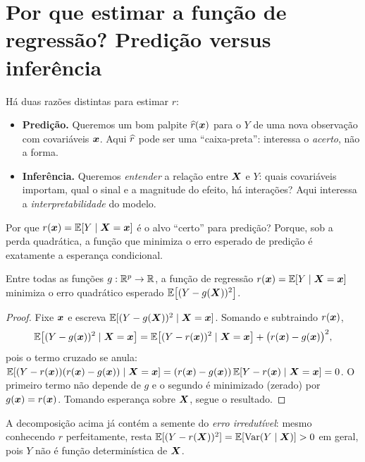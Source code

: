 \documentclass[11pt,a4paper]{article}
\begin{document}
\section{Por que estimar a função de regressão? Predição versus inferência}
Há duas razões distintas para estimar $r$:
\begin{itemize}[leftmargin=1.4cm]
  \item \textbf{Predição.} Queremos um bom palpite $\widehat{r}(\bm{x})$ para o $Y$ de uma
        nova observação com covariáveis $\bm{x}$. Aqui $\widehat{r}$ pode ser uma
        ``caixa-preta'': interessa o \emph{acerto}, não a forma.
  \item \textbf{Inferência.} Queremos \emph{entender} a relação entre $\bm{X}$ e $Y$:
        quais covariáveis importam, qual o sinal e a magnitude do efeito, há
        interações? Aqui interessa a \emph{interpretabilidade} do modelo.
\end{itemize}

\begin{ideia}
Por que $r(\bm{x})=\mathbb{E}[Y\mid\bm{X}=\bm{x}]$ é o alvo ``certo'' para predição? Porque, sob a
perda quadrática, a função que minimiza o erro esperado de predição é exatamente a
esperança condicional.
\end{ideia}

\begin{proposicao}\label{prop:r}
Entre todas as funções $g:\mathbb{R}^p\to\mathbb{R}$, a função de regressão
$r(\bm{x})=\mathbb{E}[Y\mid\bm{X}=\bm{x}]$ minimiza o erro quadrático esperado
$\mathbb{E}\big[(Y-g(\bm{X}))^2\big]$.
\end{proposicao}
\begin{proof}
Fixe $\bm{x}$ e escreva $\mathbb{E}[(Y-g(\bm{X}))^2\mid\bm{X}=\bm{x}]$. Somando e subtraindo $r(\bm{x})$,
\[
  \mathbb{E}\big[(Y-g(\bm{x}))^2\mid\bm{X}=\bm{x}\big]
  = \mathbb{E}\big[(Y-r(\bm{x}))^2\mid\bm{X}=\bm{x}\big] + \big(r(\bm{x})-g(\bm{x})\big)^2,
\]
pois o termo cruzado se anula:
$\mathbb{E}[(Y-r(\bm{x}))(r(\bm{x})-g(\bm{x}))\mid\bm{X}=\bm{x}]=(r(\bm{x})-g(\bm{x}))\,\mathbb{E}[Y-r(\bm{x})\mid\bm{X}=\bm{x}]=0$.
O primeiro termo não depende de $g$ e o segundo é minimizado (zerado) por
$g(\bm{x})=r(\bm{x})$. Tomando esperança sobre $\bm{X}$, segue o resultado.
\end{proof}

\begin{observacao}
A decomposição acima já contém a semente do \emph{erro irredutível}: mesmo
conhecendo $r$ perfeitamente, resta $\mathbb{E}[(Y-r(\bm{X}))^2]=\mathbb{E}[\operatorname{Var}(Y\mid\bm{X})]>0$ em
geral, pois $Y$ não é função determinística de $\bm{X}$.
\end{observacao}
\end{document}
